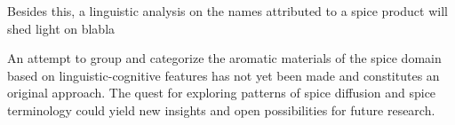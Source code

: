 Besides this, a linguistic analysis on the names attributed to a spice product will shed light on blabla




An attempt to group and categorize the aromatic materials of the spice domain based on linguistic-cognitive features has not yet been made and constitutes an original approach. The quest for exploring patterns of spice diffusion and spice terminology could yield new insights and open possibilities for future research. 






















